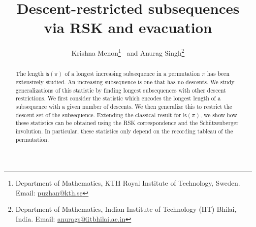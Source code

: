 \documentclass[12pt]{article}
\title{\large\textbf{Descent-restricted subsequences via RSK and evacuation}}
\author{Krishna Menon\footnote{Department of Mathematics, KTH Royal Institute of Technology, Sweden. Email: \href{mailto:puzhan@kth.se}{puzhan@kth.se}} \ and Anurag Singh\footnote{Department of Mathematics, Indian Institute of Technology (IIT) Bhilai, India. Email: \href{mailto:anurags@iitbhilai.ac.in}{anurags@iitbhilai.ac.in}}}
\date{}
\newcommand{\is}{\mathsf{is}}
\theoremstyle{definition}
\begin{document}
\maketitle

\begin{abstract}
    The length $\is(\pi)$ of a longest increasing subsequence in a permutation $\pi$ has been extensively studied. 
    An increasing subsequence is one that has no descents. 
    We study generalizations of this statistic by finding longest subsequences with other descent restrictions. 
    We first consider the statistic which encodes the longest length of a subsequence with a given number of descents. 
    We then generalize this to restrict the descent set of the subsequence. 
    Extending the classical result for $\is(\pi)$, we show how these statistics can be obtained using the RSK correspondence and the Schützenberger involution. 
    In particular, these statistics only depend on the recording tableau of the permutation.
\end{abstract}



\end{document}
